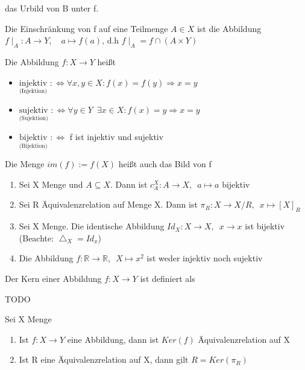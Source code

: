 \documentclass{../../meta/tudscript}
\begin{document}
das Urbild von B unter f.

Die Einschränkung von f auf eine Teilmenge \(A \in X\) ist die Abbildung
\({f \mid _A: A \rightarrow Y, \quad a \mapsto f(a)}\), d.h
\(f \mid _A = f \cap (A \times Y)\)

Die Abbildung \(f: X \rightarrow Y\) heißt

\begin{itemize}

\item
  \(\underset{\text{(Injektion)}}{\text{injektiv}}\)
  \(:\iff \forall x,y \in X: f(x) = f(y) \Rightarrow x=y\)
\item
  \(\underset{\text{(Sujektion)}}{\text{sujektiv}}\)
  \(:\iff \forall y \in Y \enspace\exists x \in X: f(x) = y \Rightarrow x=y\)
\item
  \(\underset{\text{(Bijektion)}}{\text{bijektiv}}\) \(:\iff\) f ist
  injektiv und sujektiv
\end{itemize}

Die Menge \(im(f) := f(X)\) heißt auch das Bild von f


\begin{enumerate}
\def\labelenumi{\arabic{enumi})}

\item
  Sei X Menge und \(A \subseteq X\). Dann ist
  \({c_{A}^X: A \rightarrow X, \enspace a \mapsto a}\) bijektiv
\item
  Sei R Äquivalenzrelation auf Menge X. Dann ist
  \({\pi_R: X \rightarrow X/R,\enspace x \mapsto [X]_R}\)
\item
  Sei X Menge. Die identische Abbildung
  \(Id_X : X \rightarrow X,\enspace x \rightarrow x\) ist bijektiv
  (Beachte: \(\bigtriangleup_X = Id_x\))
\item
  Die Abbildung
  \(f: \mathbb{R} \rightarrow \mathbb{R},\enspace X \mapsto x^2\) ist
  weder injektiv noch sujektiv
\end{enumerate}


Der Kern einer Abbildung \(f: X \rightarrow Y\) ist definiert als

TODO


Sei X Menge

\begin{enumerate}
\def\labelenumi{\arabic{enumi})}

\item
  Ist \(f: X \rightarrow Y\) eine Abbildung, dann ist \(Ker(f)\)
  Äquivalenzrelation auf X
\item
  Ist R eine Äquivalenzrelation auf X, dann gilt \(R = Ker(\pi_R)\)
\end{enumerate}
\end{document}
